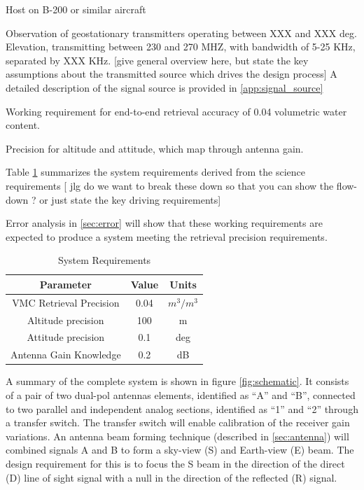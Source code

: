 \documentclass[draftcls,onecolumn]{IEEEtran}  %
\begin{document}
Host on B-200 or similar aircraft

Observation of geostationary transmitters operating between XXX and XXX deg. Elevation, transmitting between 230 and 270 MHZ, with bandwidth of 5-25 KHz, separated by XXX KHz. [give general overview here, but state the key assumptions about the transmitted source which drives the design process]  A detailed description of the signal source is provided in \ref{app:signal_source}

Working requirement for end-to-end retrieval accuracy of 0.04 volumetric water content.

Precision for altitude and attitude, which map through antenna gain. 

Table \ref{tab:sysreq} summarizes the system requirements derived from the science requirements [ jlg do we want to break these down so that you can show the flow-down ? or just state the key driving requirements]

Error analysis in \ref{sec:error} will show that these working requirements are expected to produce a system meeting the retrieval precision requirements. 

\begin{table}
\label{tab:sysreq}
\caption{System Requirements}
\begin{tabular}{|c|c|c|}
\hline
Parameter &  Value & Units \\
\hline
VMC Retrieval Precision &  0.04 & $m^3/m^3$ \\
\hline
Altitude precision &  100 & m \\
\hline
Attitude precision & 0.1 & deg \\
\hline 
Antenna Gain Knowledge & 0.2 & dB \\
\hline 
\end{tabular}

\end{table}

A summary of the complete system is shown in figure \ref{fig:schematic}.  It consists of a pair of two dual-pol antennas elements, identified as ``A'' and ``B'', connected to two parallel and independent analog sections, identified as ``1'' and ``2''  through a transfer switch.  The transfer switch will enable calibration of the receiver gain variations.  An antenna beam forming technique (described in \ref{sec:antenna}) will combined signals A and B to form a sky-view (S) and Earth-view (E) beam.  
The design requirement for this is to focus the S beam in the direction of the direct (D) line of sight signal with a null in the direction of the reflected (R) signal. 
\end{document}
